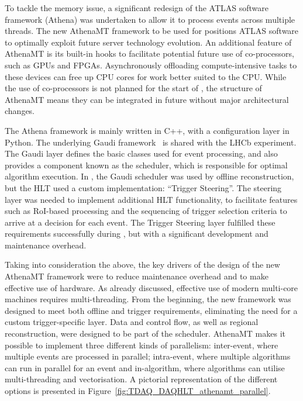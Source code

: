 \documentclass[cernpreprint, atlasdraft=false, UKenglish,british,orcidlogo, texmf, orcidlogo]{atlasdoc}
\begin{document}
To tackle the memory issue, a significant redesign of the ATLAS software framework (Athena) was undertaken to allow it to process events across multiple threads. The new \gls{AthenaMT} framework to be used for \RunThr positions ATLAS software to optimally exploit future server technology evolution. An additional feature of \gls{AthenaMT} is its built-in hooks to facilitate potential future use of co-processors, such as \glspl{GPU} and \glspl{FPGA}. Asynchronously offloading compute-intensive tasks to these devices can free up \gls{CPU} cores for work better suited to the \gls{CPU}. While the use of co-processors is not planned for the start of \RunThr, the structure of \gls{AthenaMT} means they can be integrated in future without major architectural changes.
 
The Athena framework is mainly written in C++, with a configuration layer in Python.  The underlying Gaudi framework~\cite{gaudi} is shared with the \acrshort{LHCb} experiment. The Gaudi layer defines the basic classes used for event processing, and also provides a component known as the scheduler, which is responsible for optimal algorithm execution.  In \RunTwo, the Gaudi scheduler was used by offline reconstruction,  but the \gls{HLT} used a custom implementation: “Trigger Steering”. The steering layer was needed to implement additional \gls{HLT} functionality, to facilitate features such as RoI-based processing and the sequencing of trigger selection criteria to arrive at a decision for each event. The Trigger Steering layer fulfilled these requirements successfully during \RunOneTwo, but with a significant development and maintenance overhead.
 
Taking into consideration the above, the key drivers of the design of the new \gls{AthenaMT} framework were to reduce maintenance overhead and to make effective use of hardware. As already discussed, effective use of modern multi-core machines requires multi-threading. From the beginning, the new framework was designed to meet both offline and trigger requirements, eliminating the need for a custom trigger-specific layer. Data and control flow, as well as regional reconstruction, were designed to be part of the scheduler. \gls{AthenaMT} makes it possible to implement three different kinds of parallelism: inter-event, where multiple events are processed in parallel; intra-event, where multiple algorithms can run in parallel for an event and in-algorithm, where algorithms can utilise multi-threading and vectorisation. A pictorial representation of the different options is presented in Figure~\ref{fig:TDAQ_DAQHLT_athenamt_parallel}.
 
\end{document}
